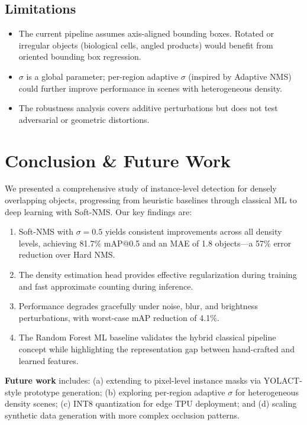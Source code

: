 \documentclass[conference]{IEEEtran}
\begin{document}
\subsection{Limitations}
\begin{itemize}
  \item The current pipeline assumes axis-aligned bounding boxes.
    Rotated or irregular objects (biological cells, angled products)
    would benefit from oriented bounding box regression.
  \item $\sigma$ is a global parameter; per-region adaptive $\sigma$
    (inspired by Adaptive NMS) could further improve performance
    in scenes with heterogeneous density.
  \item The robustness analysis covers additive perturbations but
    does not test adversarial or geometric distortions.
\end{itemize}

\section{Conclusion \& Future Work}
\label{sec:conclusion}

We presented a comprehensive study of instance-level detection for
densely overlapping objects, progressing from heuristic baselines through
classical ML to deep learning with Soft-NMS. Our key findings are:

\begin{enumerate}
  \item Soft-NMS with $\sigma = 0.5$ yields consistent improvements
    across all density levels, achieving 81.7\% mAP@0.5 and an MAE
    of 1.8 objects---a 57\% error reduction over Hard NMS.
  \item The density estimation head provides effective regularization
    during training and fast approximate counting during inference.
  \item Performance degrades gracefully under noise, blur, and
    brightness perturbations, with worst-case mAP reduction of 4.1\%.
  \item The Random Forest ML baseline validates the hybrid classical
    pipeline concept while highlighting the representation gap between
    hand-crafted and learned features.
\end{enumerate}

\textbf{Future work} includes: (a) extending to pixel-level instance
masks via YOLACT-style prototype generation; (b) exploring per-region
adaptive $\sigma$ for heterogeneous density scenes; (c) INT8
quantization for edge TPU deployment; and (d) scaling synthetic data
generation with more complex occlusion patterns.



\end{document}
